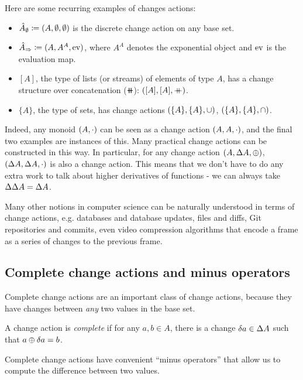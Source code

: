 Here are some recurring examples of changes actions:
\begin{itemize}
  \item $\hat{A}_\emptyset \coloneqq (A,\emptyset,\emptyset)$ is the discrete change action on any base set.
  \item $\hat{A}_\Rightarrow \coloneqq (A,A^A,\operatorname{ev})$, where $A^A$ denotes the exponential object and $\operatorname{ev}$ is the evaluation map.
  \item $[A]$, the type of lists (or streams) of elements of type $A$, has a
    change structure over concatenation ($\doubleplus$): $([A],[A],\mathbin{+\mkern-10mu+})$.
  \item $\{A\}$, the type of sets, has change actions $(\{A\},\{A\},\cup)$, $(\{A\},\{A\},\cap)$.
\end{itemize}

Indeed, any monoid $(A, \cdot)$ can be seen as a change action
$(A,A,\cdot)$, and the final two examples are instances of this. Many practical change actions
can be constructed in this way. In particular, for any change action $(A,\Delta A,\oplus)$,
$(\Delta A,\Delta A,\cdot)$ is also a change action. This means
that we don't have to do any extra work to talk about higher derivatives of
functions - we can always take $\Delta \Delta A = \Delta A$.

Many other notions in computer science can be naturally understood in terms of change actions, e.g. databases
and database updates, files and diffs, Git repositories and commits, even video compression
algorithms that encode a frame as a series of changes to the previous frame.

\subsection{Complete change actions and minus operators}

Complete change actions are an important class of change actions, because they
have changes between \emph{any} two values in the base set.

\begin{defn}
  A change action is \emph{complete} if for any $a, b \in A$, there is
  a change $\delta a \in \Delta A$ such that $a \oplus \delta a = b$.
\end{defn}

Complete change actions have convenient ``minus operators'' that allow us to
compute the difference between two values.


